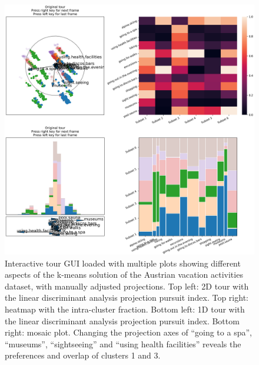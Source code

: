 \documentclass[article]{ajs}
\begin{document}
\begin{figure}[h!]
    \centering
    \includegraphics[width=1\textwidth]{winter_cl7_pre.png}
    \caption{Interactive tour GUI loaded with multiple plots showing different aspects of the k-means solution of the Austrian vacation activities dataset, with manually adjusted projections. Top left: 2D tour with the linear discriminant analysis projection pursuit index. Top right: heatmap with the intra-cluster fraction. Bottom left: 1D tour with the linear discriminant analysis projection pursuit index. Bottom right: mosaic plot. Changing the projection axes of ``going to a spa'', ``museums'', ``sightseeing'' and ``using health facilities'' reveals the preferences and overlap of clusters 1 and 3.}
    \label{fig:winter_cl7_pre}
\end{figure}
\end{document}
